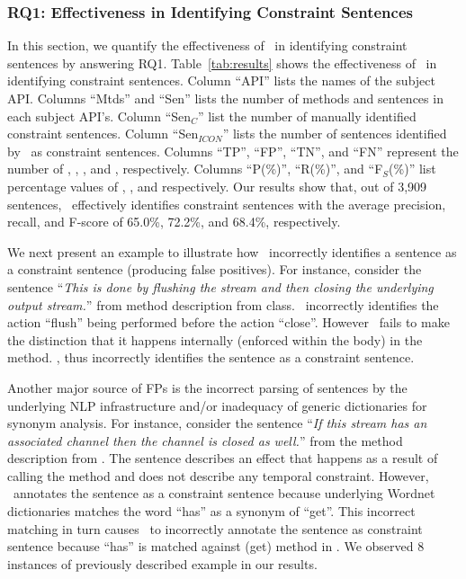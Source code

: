 \subsubsection{RQ1: Effectiveness in Identifying Constraint Sentences}


In this section, we quantify the effectiveness of \tool\ in identifying constraint sentences by answering RQ1.
Table~\ref{tab:results} shows the effectiveness of \tool\ in identifying constraint sentences.
Column ``API'' lists the names of the subject API. 
Columns ``Mtds'' and ``Sen'' lists the number of methods and sentences in each subject API's.
Column ``Sen$_C$'' list the number of manually identified constraint sentences.
Column ``Sen$_{ICON}$'' lists the number of sentences identified by \tool\ as constraint sentences. 
Columns ``TP'', ``FP'', ``TN'', and ``FN'' represent the number of , , , and , respectively. 
Columns ``P(\%)'', ``R(\%)'', and ``F$_S$(\%)'' list percentage values of , , and  respectively. 
Our results show that, out of 3,909 sentences, \tool\ effectively identifies constraint sentences with the average precision, recall, and F-score of 65.0\%, 72.2\%, and 68.4\%, respectively.

 

We next present an example to illustrate how \tool\ incorrectly identifies a sentence as a constraint sentence (producing false positives). For instance, consider the sentence ``\textit{This is done by flushing the stream and then closing the underlying output stream.}'' from   method description from  class. \tool\ incorrectly identifies the action ``flush'' being performed before the action ``close''. However \tool\ fails to make the distinction that it happens internally (enforced within the body) in the method. \tool, thus incorrectly identifies the sentence as a constraint sentence.   


Another major source of FPs is the incorrect parsing of sentences by the underlying NLP infrastructure and/or inadequacy of generic dictionaries for synonym analysis. For instance, consider the sentence ``\textit{If this stream has an associated channel then the channel is closed as well.}'' from the  method description from . The sentence describes an effect that happens as a result of calling the  method and does not describe any temporal constraint. However, \tool\ annotates the sentence as a constraint sentence because underlying Wordnet dictionaries matches the word ``has'' as a synonym of ``get''. This incorrect matching in turn causes \tool\ to incorrectly annotate the sentence as constraint sentence because ``has'' is matched against \CodeIn(get) method in . We observed 8 instances of previously described example in our results.

